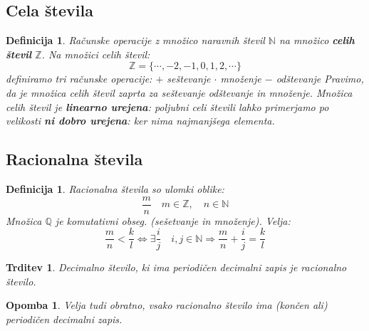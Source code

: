 \documentclass[11pt]{article}
\newtheorem{Trditev}[Izrek]{{\sc Trditev}}
\newtheorem{Definicija}[Izrek]{{\sc Definicija}}
\newtheorem{Opomba}[Izrek]{{\sc Opomba}}
\begin{document}
\subsection{Cela števila}
\begin{Definicija}
	Računske operacije z množico naravnih števil $\mathbb{N}$ na množico \textbf{celih števil} $\mathbb{Z}$. Na množici celih števil:
	$$\mathbb{Z} = \{\cdots, -2, -1,0 ,1,2,\cdots\}$$
	definiramo tri računske operacije:
	\newline
	$+$ seštevanje
	\newline
	$\cdot$ množenje
	\newline
	$-$ odštevanje
	\newline
	Pravimo, da je množica celih števil zaprta za seštevanje odštevanje in množenje. 
	\newline
	Množica celih števil je \textbf{linearno urejena}: poljubni celi števili lahko primerjamo po velikosti
	\newline
	\textbf{ni dobro urejena}: ker nima najmanjšega elementa.
	
\end{Definicija}

\subsection{Racionalna števila}

\begin{Definicija}
	Racionalna števila so ulomki oblike:
	$$\frac{m}{n} \quad m\in \mathbb{Z},\quad n\in\mathbb{N}$$
	Množica $\mathbb{Q}$ je komutativni obseg. (sešetvanje in množenje).
	\newline
	Velja:
	$$\frac{m}{n} < \frac{k}{l} \iff \exists \frac{i}{j}\quad i,j\in\mathbb{N}\Rightarrow \frac{m}{n} + \frac{i}{j} = \frac{k}{l}$$
\end{Definicija}
\begin{Trditev}
	Decimalno število, ki ima periodičen decimalni zapis je racionalno število.
\end{Trditev}
\begin{Opomba}
	Velja tudi obratno, vsako racionalno število ima (končen ali) periodičen decimalni zapis.
\end{Opomba}
\end{document}
